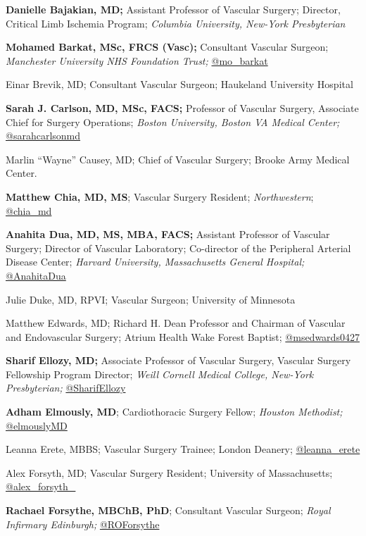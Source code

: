 \documentclass[
]{book}
\begin{document}
\textbf{Danielle Bajakian, MD;} Assistant Professor of Vascular Surgery; Director, Critical Limb Ischemia Program; \emph{Columbia University, New-York Presbyterian}

\textbf{Mohamed Barkat, MSc, FRCS (Vasc);} Consultant Vascular Surgeon; \emph{Manchester University NHS Foundation Trust;} \href{https://twitter.com/mo_barkat}{@mo\_barkat}

Einar Brevik, MD; Consultant Vascular Surgeon; Haukeland University Hospital

\textbf{Sarah J. Carlson, MD, MSc, FACS;} Professor of Vascular Surgery, Associate Chief for Surgery Operations; \emph{Boston University, Boston VA Medical Center;} \href{https://twitter.com/sarahcarlsonmd?lang=en}{@sarahcarlsonmd}

Marlin ``Wayne'' Causey, MD; Chief of Vascular Surgery; Brooke Army Medical Center.

\textbf{Matthew Chia, MD, MS}; Vascular Surgery Resident; \emph{Northwestern}; \href{https://twitter.com/chia_md?lang=en}{@chia\_md}

\textbf{Anahita Dua, MD, MS, MBA, FACS;} Assistant Professor of Vascular Surgery; Director of Vascular Laboratory; Co-director of the Peripheral Arterial Disease Center; \emph{Harvard University, Massachusetts General Hospital;} \href{https://twitter.com/anahitadua}{@AnahitaDua}

Julie Duke, MD, RPVI; Vascular Surgeon; University of Minnesota

Matthew Edwards, MD; Richard H. Dean Professor and Chairman of Vascular and Endovascular Surgery; Atrium Health Wake Forest Baptist; \href{https://mobile.twitter.com/msedwards0427}{@msedwards0427}

\textbf{Sharif Ellozy, MD;} Associate Professor of Vascular Surgery, Vascular Surgery Fellowship Program Director; \emph{Weill Cornell Medical College, New-York Presbyterian;} \href{https://twitter.com/sharifellozy}{@SharifEllozy}

\textbf{Adham Elmously, MD}; Cardiothoracic Surgery Fellow; \emph{Houston Methodist;} \href{https://twitter.com/elmouslymd?lang=en}{@elmouslyMD}

Leanna Erete, MBBS; Vascular Surgery Trainee; London Deanery; \href{https://twitter.com/leanna_erete?lang=en}{@leanna\_erete}

Alex Forsyth, MD; Vascular Surgery Resident; University of Massachusetts; \href{https://twitter.com/alex_forsyth_}{@alex\_forsyth\_}

\textbf{Rachael Forsythe, MBChB, PhD}; Consultant Vascular Surgeon; \emph{Royal Infirmary Edinburgh;} \href{https://twitter.com/roforsythe?lang=en}{@ROForsythe}
\end{document}
